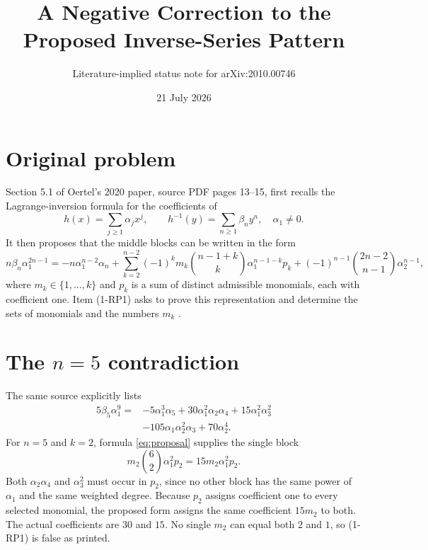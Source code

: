 \documentclass[11pt]{article}
\title{A Negative Correction to the Proposed Inverse-Series Pattern}
\author{Literature-implied status note for arXiv:2010.00746}
\date{21 July 2026}
\begin{document}
\maketitle

\begin{center}
\end{center}

\section*{Original problem}

Section 5.1 of Oertel's 2020 paper, source PDF pages 13--15, first recalls the
Lagrange-inversion formula for the coefficients of
\[
 h(x)=\sum_{j\geq1}\alpha_jx^j,\qquad
 h^{-1}(y)=\sum_{n\geq1}\beta_ny^n,
 \quad \alpha_1\neq0.
\]
It then proposes that the middle blocks can be written in the form
\begin{equation}\label{eq:proposal}
 n\beta_n\alpha_1^{2n-1}
 =-n\alpha_1^{n-2}\alpha_n
 +\sum_{k=2}^{n-2}(-1)^k m_k
 \binom{n-1+k}{k}\alpha_1^{n-1-k}p_k
 +(-1)^{n-1}\binom{2n-2}{n-1}\alpha_2^{n-1},
\end{equation}
where $m_k\in\{1,\ldots,k\}$ and $p_k$ is a sum of distinct admissible
monomials, each with coefficient one.  Item (1-RP1) asks to prove this
representation and determine the sets of monomials and the numbers $m_k$
\cite{oertel2020}.

\section*{The $n=5$ contradiction}

The same source explicitly lists
\begin{align*}
5\beta_5\alpha_1^9={}&-5\alpha_1^3\alpha_5
+30\alpha_1^2\alpha_2\alpha_4
+15\alpha_1^2\alpha_3^2\\
&-105\alpha_1\alpha_2^2\alpha_3+70\alpha_2^4.
\end{align*}
For $n=5$ and $k=2$, formula \eqref{eq:proposal} supplies the single block
\[
 m_2\binom{6}{2}\alpha_1^2p_2=15m_2\alpha_1^2p_2.
\]
Both $\alpha_2\alpha_4$ and $\alpha_3^2$ must occur in $p_2$, since no other
block has the same power of $\alpha_1$ and the same weighted degree.  Because
$p_2$ assigns coefficient one to every selected monomial, the proposed form
assigns the same coefficient $15m_2$ to both.  The actual coefficients are
$30$ and $15$.  No single $m_2$ can equal both $2$ and $1$, so (1-RP1) is
false as printed.
\end{document}
